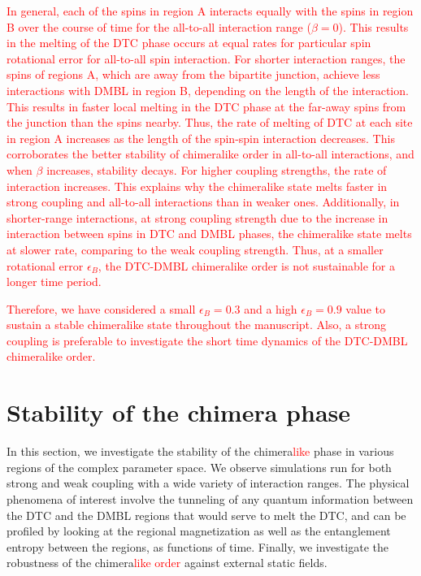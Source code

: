 \documentclass[12pt]{iopart}
\newcommand{\red}[1]{\textcolor{red}{#1}}
\begin{document}
\red{ In general, each of the spins in region A interacts equally with the spins in region B over the course of time for the all-to-all interaction range ($\beta=0$). This results in the melting of the DTC phase occurs at equal rates for particular spin rotational error for all-to-all spin interaction. For shorter interaction ranges, the spins of regions A, which are away from the bipartite junction, achieve less interactions with DMBL in region B, depending on the length of the interaction. This results in faster local melting in the DTC phase at the far-away spins from the junction than the spins nearby. Thus, the rate of melting of DTC at each site in region A increases as the length of the spin-spin interaction decreases. This corroborates the better stability of chimeralike order in all-to-all interactions, and when $\beta$ increases, stability decays. For higher coupling strengths, the rate of interaction increases. This explains why the chimeralike state melts faster in strong coupling and all-to-all interactions than in weaker ones. Additionally, in shorter-range interactions, at strong coupling strength due to the increase in interaction between spins in DTC and DMBL phases, the chimeralike state melts at slower rate, comparing to the weak coupling strength. Thus, at a smaller rotational error $\epsilon_B$, the DTC-DMBL chimeralike order is not sustainable for a longer time period.}

\red{ Therefore, we have considered a small $\epsilon_B = 0.3$ and a high $\epsilon_B = 0.9$ value to sustain a stable chimeralike state throughout the manuscript. Also, a strong coupling is preferable to investigate the short time dynamics of the DTC-DMBL chimeralike order.}

\section{\label{sec:level4} Stability of the chimera phase}
In this section, we investigate the stability of the chimera\red{like} phase in various regions of the complex parameter space. We observe simulations run for both strong and weak coupling with a wide variety of interaction ranges. The physical phenomena of interest involve the tunneling of any quantum information between the DTC and the DMBL regions that would serve to melt the DTC, and can be profiled by looking at the regional magnetization as well as the entanglement entropy between the regions, as functions of time. Finally, we investigate the robustness of the chimera\red{like order} against external static fields.
\end{document}
